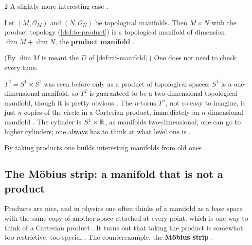 \begin{paracol}{2}
A slightly more interesting case .
\begin{definition}\label{def:mf-product}
Let $(M,\mathcal O_M)$ and $(N,\mathcal O_N)$ be topological manifolds. Then $M\times N$ with the product topology (\cref{def:to-product}) is a topological manifold of dimension $\dim M+\dim N$, the \textbf{product manifold}
.
\end{definition}
(By $\dim M$ is meant the $D$ of \cref{def:mf-manifold}.) One does not need to check every time.
\begin{example}\label{ex:mf-torus}
$T^2=S^1\times S^1$ was seen before only as a product of topological spaces; $S^1$ is a one-dimensional manifold, so $T^2$ is guaranteed to be a two-dimensional topological manifold, though it is pretty obvious .
The $n$-torus $T^n$, not so easy to imagine, is just $n$ copies of the circle in a Cartesian product, immediately an $n$-dimensional manifold .
The cylinder is $S^1\times\mathbb{R}$, as manifolds two-dimensional; one can go to higher cylinders; one always has to think at what level one is .
\end{example}
By taking products one builds interesting manifolds from old ones .

\subsection{The Möbius strip: a manifold that is not a product}

Products are nice, and in physics one often thinks of a manifold as a base space with the same copy of another space attached at every point, which is one way to think of a Cartesian product .
It turns out that taking the product is somewhat too restrictive, too special . The counterexample: the \textbf{Möbius strip} .


\end{paracol}

